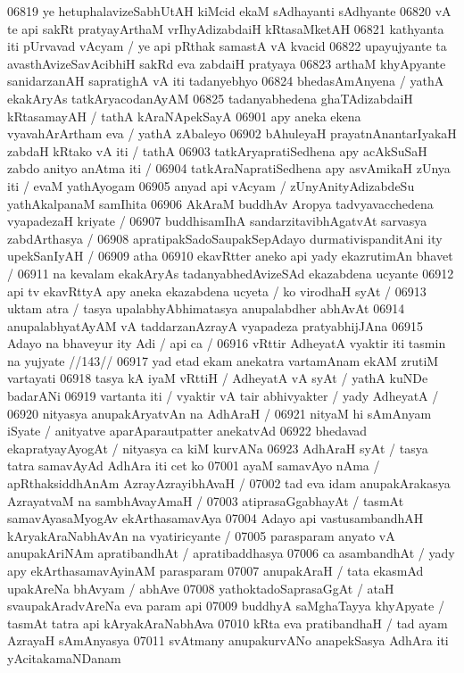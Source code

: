 06819 ye hetuphalavizeSabhUtAH kiMcid ekaM sAdhayanti sAdhyante 
06820 vA te api sakRt pratyayArthaM vrIhyAdizabdaiH kRtasaMketAH 
06821 kathyanta iti pUrvavad vAcyam / ye api pRthak samastA vA kvacid 
06822 upayujyante ta avasthAvizeSavAcibhiH sakRd eva zabdaiH pratyaya
06823 arthaM khyApyante sanidarzanAH sapratighA vA iti tadanyebhyo
06824 bhedasAmAnyena / yathA ekakAryAs tatkAryacodanAyAM
06825 tadanyabhedena ghaTAdizabdaiH kRtasamayAH / tathA kAraNApekSayA
06901 apy aneka ekena vyavahArArtham eva / yathA zAbaleyo
06902 bAhuleyaH prayatnAnantarIyakaH zabdaH kRtako vA iti / tathA 
06903 tatkAryapratiSedhena apy acAkSuSaH zabdo anityo anAtma iti /
06904 tatkAraNapratiSedhena apy asvAmikaH zUnya iti / evaM yathAyogam  
06905 anyad api vAcyam / zUnyAnityAdizabdeSu yathAkalpanaM samIhita 
06906 AkAraM buddhAv Aropya tadvyavacchedena vyapadezaH kriyate / 
06907 buddhisamIhA sandarzitavibhAgatvAt sarvasya zabdArthasya /  
06908 apratipakSadoSaupakSepAdayo durmativispanditAni ity  upekSanIyAH /
06909 atha 
06910 	ekavRtter aneko api yady ekazrutimAn bhavet /
06911 na kevalam ekakAryAs tadanyabhedAvizeSAd ekazabdena ucyante
06912 api tv ekavRttyA apy aneka ekazabdena ucyeta / ko virodhaH syAt /  
06913 uktam atra / tasya upalabhyAbhimatasya anupalabdher abhAvAt  
06914 anupalabhyatAyAM vA taddarzanAzrayA vyapadeza pratyabhijJAna
06915 Adayo na bhaveyur ity Adi / api ca /
06916 	vRttir AdheyatA vyaktir iti tasmin na yujyate //143//  
06917 yad etad ekam anekatra vartamAnam ekAM zrutiM vartayati  
06918 tasya kA iyaM vRttiH / AdheyatA vA syAt / yathA kuNDe badarANi  
06919 vartanta iti / vyaktir vA tair abhivyakter / yady AdheyatA /  
06920 	nityasya anupakAryatvAn na AdhAraH / 
06921 nityaM hi sAmAnyam iSyate / anityatve aparAparautpatter  anekatvAd
06922 bhedavad ekapratyayAyogAt / nityasya ca kiM kurvANa  
06923 AdhAraH syAt / tasya tatra samavAyAd AdhAra iti cet ko 
07001 ayaM samavAyo nAma / apRthaksiddhAnAm AzrayAzrayibhAvaH /
07002 tad eva idam anupakArakasya AzrayatvaM na sambhAvayAmaH / 
07003 atiprasaGgabhayAt / tasmAt samavAyasaMyogAv ekArthasamavAya 
07004 Adayo api vastusambandhAH kAryakAraNabhAvAn na vyatiricyante /  
07005 parasparam anyato vA anupakAriNAm apratibandhAt / apratibaddhasya  
07006 ca asambandhAt / yady apy ekArthasamavAyinAM parasparam 
07007 anupakAraH / tata ekasmAd upakAreNa bhAvyam / abhAve  
07008 yathoktadoSaprasaGgAt / ataH svaupakAradvAreNa eva param api 
07009 buddhyA saMghaTayya khyApyate / tasmAt tatra api kAryakAraNabhAva  
07010 kRta eva pratibandhaH / tad ayam AzrayaH sAmAnyasya  
07011 svAtmany anupakurvANo anapekSasya AdhAra iti yAcitakamaNDanam 
